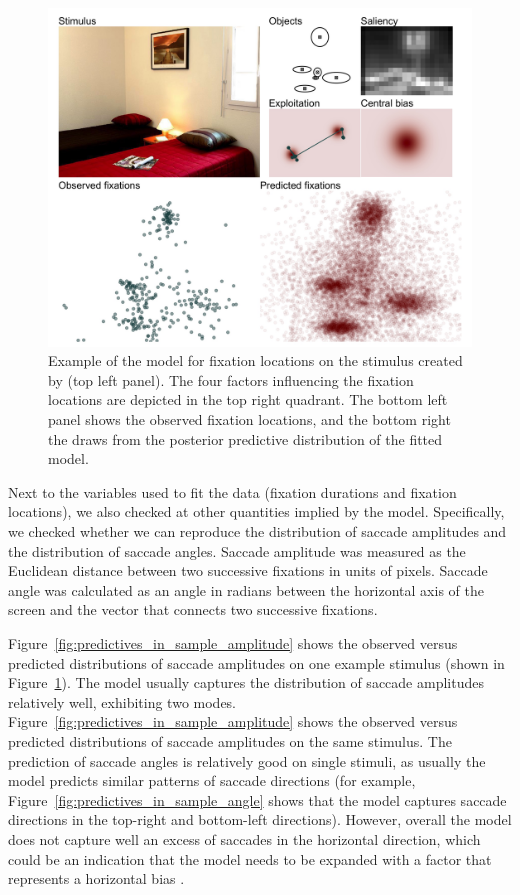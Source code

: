 \documentclass{article}
\begin{document}
\begin{figure}
    \centering
    \includegraphics[width=\textwidth]{figures/fit_model/in_sample/xy/1251.jpg}
    \caption{Example of the model for fixation locations on the stimulus created by \citet{xu2014beyond} (top left panel). The four factors influencing the fixation locations are depicted in the top right quadrant. The bottom left panel shows the observed fixation locations, and the bottom right the draws from the posterior predictive distribution of the fitted model.}
    \label{fig:predictives_in_sample_xy}
\end{figure}

Next to the variables used to fit the data (fixation durations and fixation locations), we also checked at other quantities implied by the model. Specifically, we checked whether we can reproduce the distribution of saccade amplitudes and the distribution of saccade angles.  Saccade amplitude was measured as the Euclidean distance between two successive fixations in units of pixels. Saccade angle was calculated as an angle in radians between the horizontal axis of the screen and the vector that connects two successive fixations.

Figure~\ref{fig:predictives_in_sample_amplitude} shows the observed versus predicted distributions of saccade amplitudes on one example stimulus (shown in Figure~\ref{fig:predictives_in_sample_xy}). The model usually captures the distribution of saccade amplitudes relatively well, exhibiting two modes. Figure~\ref{fig:predictives_in_sample_amplitude} shows the observed versus predicted distributions of saccade amplitudes on the same stimulus. The prediction of saccade angles is relatively good on single stimuli, as usually the model predicts similar patterns of saccade directions (for example, Figure~\ref{fig:predictives_in_sample_angle} shows that the model captures saccade directions in the top-right and bottom-left directions). However, overall the model does not capture well an excess of saccades in the horizontal direction, which could be an indication that the model needs to be expanded with a factor that represents a horizontal bias \citep{renswoude2016horizontal}.
\end{document}
